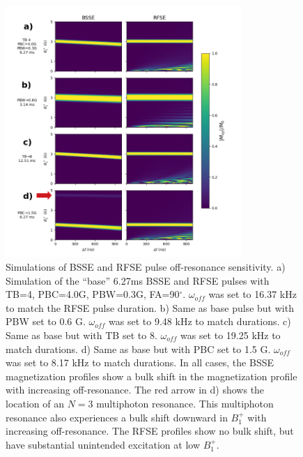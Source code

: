 \documentclass{article}
\begin{document}
\begin{figure}[h]
\centering
\includegraphics[width=0.8\textwidth]{figures/offres_processed.png}
\caption{Simulations of BSSE and RFSE pulse off-resonance sensitivity. 
a) Simulation of the ``base'' 6.27ms BSSE and RFSE pulses with TB=4, PBC=4.0G, PBW=0.3G, FA=90$^\circ$. 
$\omega_{off}$ was set to  16.37 kHz to match the RFSE pulse duration. 
b) Same as base pulse but with PBW set to 0.6 G. 
$\omega_{off}$ was set to 9.48 kHz to match durations. 
c) Same as base but with TB set to 8. 
$\omega_{off}$ was set to 19.25 kHz to match durations. 
d) Same as base but with PBC set to 1.5 G. 
$\omega_{off}$ was set to 8.17 kHz to match durations.
In all cases, the BSSE magnetization profiles show a bulk shift in the magnetization profile with increasing off-resonance. 
The red arrow in d) shows the location of an $N=3$ multiphoton resonance. 
This multiphoton resonance also experiences a bulk shift downward in $B_1^+$ with increasing off-resonance. 
The RFSE profiles show no bulk shift, but have substantial unintended excitation at low $B_1^+$.}
\label{fig:offres}
\end{figure}
\end{document}
